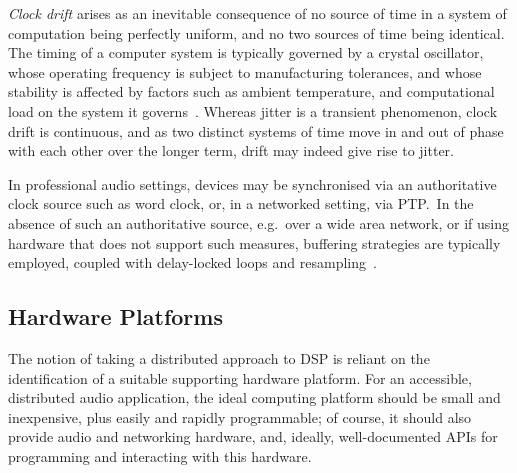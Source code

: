 \documentclass[utf8]{FrontiersinHarvard}
\begin{document}
    \textit{Clock drift} arises as an inevitable consequence of no source of
    time in a system of computation being perfectly uniform, and no two sources
    of time being identical.
    The timing of a computer system is typically governed by a crystal
    oscillator, whose operating frequency is subject to manufacturing
    tolerances, and whose stability is affected by factors such as ambient
    temperature, and computational load on the system it
    governs~\citep{marouani_internal_2008}.
    Whereas jitter is a transient phenomenon, clock drift is continuous, and as
    two distinct systems of time move in and out of phase with each other over
    the longer term, drift may indeed give rise to jitter.

    In professional audio settings, devices may be synchronised via an
    authoritative clock source such as word clock, or, in a networked setting,
    via PTP.\
    In the absence of such an authoritative source, e.g.\ over a wide area
    network, or if using hardware that does not support such measures, buffering
    strategies are typically employed, coupled with delay-locked loops and
    resampling~\citep{adriaensen_using_2005, adriaensen_controlling_2012}.

    \subsection{Hardware Platforms}\label{subsec:hardware-platforms}

    The notion of taking a distributed approach to DSP is reliant on the
    identification of a suitable supporting hardware platform.
    For an accessible, distributed audio application, the ideal computing platform
    should be small and inexpensive, plus easily and rapidly programmable;
    of course, it should also provide audio and networking hardware, and, ideally,
    well-documented APIs for programming and interacting with this hardware.
\end{document}
